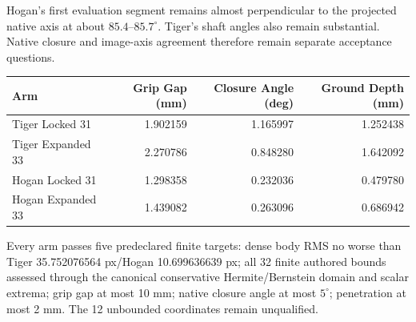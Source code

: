 \documentclass[11pt,letterpaper]{article}
\begin{document}
Hogan's first evaluation segment remains almost perpendicular to the projected native axis
at about $85.4$--$85.7^\circ$. Tiger's shaft angles also remain substantial.
Native closure and image-axis agreement therefore remain separate acceptance questions.
\par\smallskip
\begin{tabular}{@{}lrrr@{}}\toprule
Arm & Grip Gap (mm) & Closure Angle (deg) & Ground Depth (mm)\\\midrule
Tiger Locked 31 & 1.902159 & 1.165997 & 1.252438 \\
Tiger Expanded 33 & 2.270786 & 0.848280 & 1.642092 \\
Hogan Locked 31 & 1.298358 & 0.232036 & 0.479780 \\
Hogan Expanded 33 & 1.439082 & 0.263096 & 0.686942 \\
\bottomrule\end{tabular}\par\smallskip

Every arm passes five predeclared finite targets: dense body RMS no worse than Tiger
35.752076564 px/Hogan 10.699636639 px; all 32 finite authored bounds assessed through the
canonical conservative Hermite/Bernstein domain and scalar extrema; grip gap at most 10 mm;
native closure angle at most $5^\circ$; penetration at most 2 mm.
The 12 unbounded coordinates remain unqualified.
\end{document}
